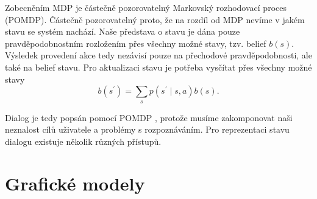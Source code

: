 Zobecněním MDP je částečně pozorovatelný Markovský rozhodovací proces (POMDP). 
Částečně pozorovatelný proto, že na rozdíl od MDP nevíme v jakém stavu se systém nachází.
Naše představa o stavu je dána pouze pravděpodobnostním rozložením přes všechny možné stavy, tzv. belief $b(s)$.
Výsledek provedení akce tedy nezávisí pouze na přechodové pravděpodobnosti, ale také na belief stavu. 
Pro aktualizaci stavu je potřeba vysčítat přes všechny možné stavy
\begin{equation}
b(s^\prime) = \sum_s p(s^\prime \mid s, a) b(s).
\end{equation}

Dialog je tedy popsán pomocí POMDP \cite{williams2007partially}, protože musíme zakomponovat naši neznalost cílů uživatele a problémy s rozpoznáváním. 
Pro reprezentaci stavu dialogu existuje několik různých přístupů.

\section{Grafické modely}

